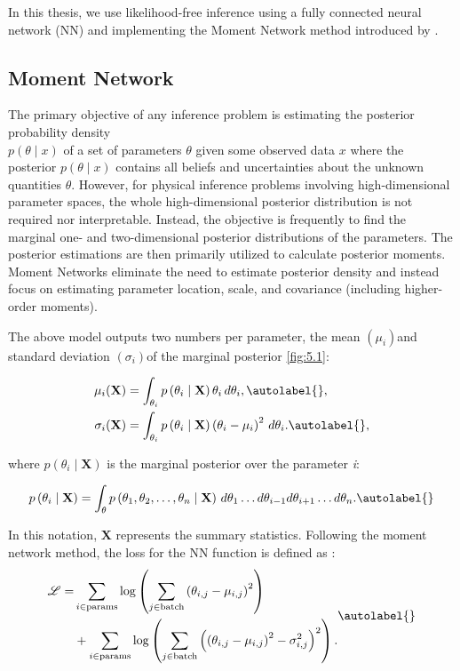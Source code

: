 In this thesis, we use likelihood-free inference using a fully connected neural network (NN) and implementing the Moment Network method introduced by \cite{jeffrey2020solvinghighdimensionalparameterinference}.

\subsection{Moment Network}

The primary objective of any inference problem is estimating the posterior probability density \\ $p(\theta\mid x)$ of a set of parameters $\theta$ given some observed data $x$ where the posterior $p(\theta\mid x)$ contains all beliefs and uncertainties about the unknown quantities $\theta $. However, for physical inference problems involving high-dimensional parameter spaces, the whole high-dimensional posterior distribution is not required nor interpretable. Instead, the objective is frequently to find the marginal one- and two-dimensional posterior distributions of the parameters. The posterior estimations are then primarily utilized to calculate posterior moments. Moment Networks eliminate the need to estimate posterior density and instead focus on estimating parameter location, scale, and covariance (including higher-order moments).

The above model outputs two numbers per parameter, the mean $\left(\mu_i\right) $and standard deviation $\left(\sigma_i\right) $of the marginal posterior \ref{fig:5.1}:

\begin{align}
    \mu_i(\mathbf{X}) &= \int_{\theta_i} p\left(\theta_i \mid \mathbf{X}\right) \theta_i \, d \theta_i, \autolabel{}, \\
    \sigma_i(\mathbf{X}) &= \int_{\theta_i} p\left(\theta_i \mid \mathbf{X}\right) \left(\theta_i - \mu_i\right)^2 \, d \theta_i. \autolabel{},
\end{align}

where $p\left(\theta_i \mid \mathbf{X}\right)$ is the marginal posterior over the parameter \emph{i}:

\begin{equation}
    p\left(\theta_i \mid \mathbf{X}\right) = \int_\theta p\left(\theta_1, \theta_2, \ldots, \theta_n \mid \mathbf{X}\right) \, d \theta_1 \ldots d \theta_{i-1} d \theta_{i+1} \ldots d \theta_n . \autolabel{}
\end{equation}


In this notation, $ \mathbf{X} $ represents the summary statistics. Following the moment network method, the loss for the NN function is defined as \cite{camelsVillaescusa_Navarro_2022}:
\begin{equation}
    \begin{aligned}
        \mathcal{L} = & \sum_{i \in \text{params}} \log \left( \sum_{j \in \text{batch}} \left(\theta_{i, j} - \mu_{i, j}\right)^2 \right) \\
        & + \sum_{i \in \text{params}} \log \left( \sum_{j \in \text{batch}} \left( \left(\theta_{i, j} - \mu_{i, j}\right)^2 - \sigma_{i, j}^2 \right)^2 \right) .
    \end{aligned}\autolabel{}
\end{equation}

